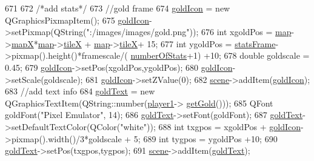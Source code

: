 \begin{DoxyCode}
671 
672     \textcolor{comment}{/*add stats*/}
673     \textcolor{comment}{//gold frame}
674     \hyperlink{class_game_a1ac5cae6ba58ec5fe157b138d6c41eac}{goldIcon} = \textcolor{keyword}{new} QGraphicsPixmapItem();
675     \hyperlink{class_game_a1ac5cae6ba58ec5fe157b138d6c41eac}{goldIcon}->setPixmap(QString(\textcolor{stringliteral}{":/images/images/gold.png"}));
676     \textcolor{keywordtype}{int} xgoldPos = \hyperlink{class_game_acef3a39fdf14be2c980b0dc11e7be402}{map}->\hyperlink{class_map_acfd20721da29a2e353598555e23e12f0}{mapX}*\hyperlink{class_game_acef3a39fdf14be2c980b0dc11e7be402}{map}->\hyperlink{class_map_af2aa425dd22aba483ae973c4a15fe934}{tileX} + \hyperlink{class_game_acef3a39fdf14be2c980b0dc11e7be402}{map}->\hyperlink{class_map_af2aa425dd22aba483ae973c4a15fe934}{tileX}+ 15;
677     \textcolor{keywordtype}{int} ygoldPos = \hyperlink{class_game_a3b40718d348c0f12af63a3f428924ab4}{statsFrame}->pixmap().height()*framescale/(
      \hyperlink{class_game_af041d097dc2350360c7951e5a41bc48a}{numberOfStats}+1) +10;
678     \textcolor{keywordtype}{double} goldscale = 0.45;
679     \hyperlink{class_game_a1ac5cae6ba58ec5fe157b138d6c41eac}{goldIcon}->setPos(xgoldPos,ygoldPos);
680     \hyperlink{class_game_a1ac5cae6ba58ec5fe157b138d6c41eac}{goldIcon}->setScale(goldscale);
681     \hyperlink{class_game_a1ac5cae6ba58ec5fe157b138d6c41eac}{goldIcon}->setZValue(0);
682     \hyperlink{class_game_a8119e3b9a632906c6808fa294b46a92a}{scene}->addItem(\hyperlink{class_game_a1ac5cae6ba58ec5fe157b138d6c41eac}{goldIcon});
683     \textcolor{comment}{//add text info}
684     \hyperlink{class_game_a744c42428dc6293af83752027f9cbfde}{goldText} = \textcolor{keyword}{new} QGraphicsTextItem(QString::number(\hyperlink{class_game_ad8a7cc146f99c7ec5b7c3c25d73f118c}{player1}->
      \hyperlink{class_player1_a9395a16fecb7b96395455f096ac1b60b}{getGold}()));
685     QFont goldFont(\textcolor{stringliteral}{"Pixel Emulator"}, 14);
686     \hyperlink{class_game_a744c42428dc6293af83752027f9cbfde}{goldText}->setFont(goldFont);
687     \hyperlink{class_game_a744c42428dc6293af83752027f9cbfde}{goldText}->setDefaultTextColor(QColor(\textcolor{stringliteral}{"white"}));
688     \textcolor{keywordtype}{int} txgpos = xgoldPos + \hyperlink{class_game_a1ac5cae6ba58ec5fe157b138d6c41eac}{goldIcon}->pixmap().width()/3*goldscale + 5;
689     \textcolor{keywordtype}{int} tygpos = ygoldPos +10;
690     \hyperlink{class_game_a744c42428dc6293af83752027f9cbfde}{goldText}->setPos(txgpos,tygpos);
691     \hyperlink{class_game_a8119e3b9a632906c6808fa294b46a92a}{scene}->addItem(\hyperlink{class_game_a744c42428dc6293af83752027f9cbfde}{goldText});

\end{DoxyCode}
